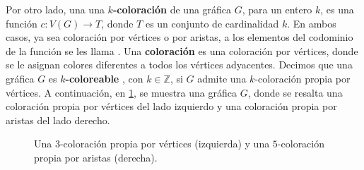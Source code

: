 Por otro lado, una una \textbf{$k$-coloraci\'on}
 de
una gr\'afica $G$, para un entero $k$, es una funci\'on $c \colon V(G)\to T$,
donde $T$ es un conjunto de cardinalidad $k$. En ambos casos, ya sea
coloraci\'on por v\'ertices o por aristas, a los elementos del codominio de la
funci\'on se les llama . Una \textbf{coloraci\'on}
 es una coloraci\'on por
v\'ertices, donde se le asignan colores diferentes a todos los v\'ertices
adyacentes. Decimos que una gr\'afica $G$ es $k$\textbf{-coloreable}
, con $k \in \mathbb{Z}$, si $G$ admite
una $k$-coloraci\'on propia por v\'ertices. A continuaci\'on, en
\cref{fig:ex-color-prop}, se muestra una gr\'afica $G$, donde se resalta una
coloraci\'on propia por v\'ertices del lado izquierdo y una coloraci\'on propia
por aristas del lado derecho. 

\begin{figure}[ht!]
    \centering
    \caption{Una $3$-coloraci\'on propia por v\'ertices (izquierda) y una
        $5$-coloraci\'on propia por aristas (derecha).}
        \label{fig:ex-color-prop}
\end{figure}

